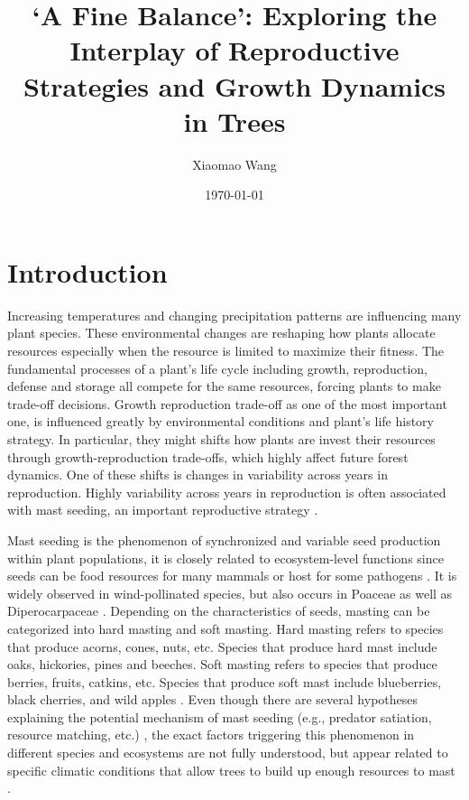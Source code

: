 \documentclass[11pt,letter]{article}
\begin{document}
\title{`A Fine Balance': Exploring the Interplay of Reproductive Strategies and Growth Dynamics in Trees}
\author{Xiaomao Wang} 
\date{\today}
\maketitle

\setlength{\parindent}{0pt}
\setlength{\parskip}{3pt}

\section{Introduction} 
Increasing temperatures and changing precipitation patterns are influencing many plant species. These environmental changes are reshaping how plants allocate resources especially when the resource is limited to maximize their fitness. The fundamental processes of a plant's life cycle including growth, reproduction, defense and storage all compete for the same resources, forcing plants to make trade-off decisions. Growth reproduction trade-off as one of the most important one, is influenced greatly by environmental conditions and plant's life history strategy. In particular, they might shifts how plants are invest their resources through growth-reproduction trade-offs, which highly affect future forest dynamics. One of these shifts is changes in variability across years in reproduction. Highly variability across years in reproduction is often associated with mast seeding, an important reproductive strategy \citep{pearse2016mechanisms}.\par
Mast seeding is the phenomenon of synchronized and variable seed production within plant populations, it is closely related to ecosystem-level functions since seeds can be food resources for many mammals or host for some pathogens  \citep{janzen1971seed, kelly1994evolutionary, davies2024seed}. It is widely observed in wind-pollinated species, but also occurs in Poaceae as well as Diperocarpaceae \citep{kelly2002mast}. Depending on the characteristics of seeds, masting can be categorized into hard masting and soft masting. Hard masting refers to species that produce acorns, cones, nuts, etc. Species that produce hard mast include oaks, hickories, pines and beeches. Soft masting refers to species that produce berries, fruits, catkins, etc. Species that produce soft mast include blueberries, black cherries, and wild apples \citep{harmon1989mast}. Even though there are several hypotheses explaining the potential mechanism of mast seeding (e.g., predator satiation, resource matching, etc.)  \citep{koenig2021brief}, the exact factors triggering this phenomenon in different species and ecosystems are not fully understood, but appear related to specific climatic conditions that allow trees to build up enough resources to mast  \citep{pearse2016mechanisms}. \par
\end{document}
